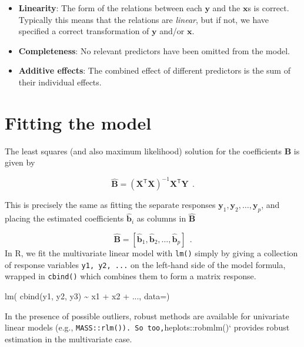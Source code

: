 \documentclass[
  letterpaper,
  10pt,
  krantz2]{krantz}
\makeatletter
\newenvironment{Shaded}{\begin{snugshade}}{\end{snugshade}}
\newcommand{\AttributeTok}[1]{\textcolor[rgb]{0.40,0.45,0.13}{#1}}
\newcommand{\FunctionTok}[1]{\textcolor[rgb]{0.28,0.35,0.67}{#1}}
\newcommand{\NormalTok}[1]{\textcolor[rgb]{0.00,0.23,0.31}{#1}}
\newcommand{\SpecialCharTok}[1]{\textcolor[rgb]{0.37,0.37,0.37}{#1}}
\newenvironment{kframe}{%
  \medskip{}
  \setlength{\fboxsep}{.8em}
  \def\at@end@of@kframe{}%
  \ifinner\ifhmode%
  \def\at@end@of@kframe{\end{minipage}}%
  \begin{minipage}{\columnwidth}%
  \fi\fi%
  \def\FrameCommand##1{\hskip\@totalleftmargin \hskip-\fboxsep
  \colorbox{shadecolor}{##1}\hskip-\fboxsep
      \hskip-\linewidth \hskip-\@totalleftmargin \hskip\columnwidth}%
  \MakeFramed {\advance\hsize-\width
    \@totalleftmargin\z@ \linewidth\hsize
    \@setminipage}}%
{\par\unskip\endMakeFramed%
  \at@end@of@kframe}
\renewenvironment{Shaded}{\begin{kframe}}{\end{kframe}}
\makeatother
\begin{document}
\begin{itemize}
\item
  \textbf{Linearity}: The form of the relations between each
  \(\mathbf{y}\) and the \(\mathbf{x}\)s is correct. Typically this
  means that the relations are \emph{linear}, but if not, we have
  specified a correct transformation of \(\mathbf{y}\) and/or
  \(\mathbf{x}\).
\item
  \textbf{Completeness}: No relevant predictors have been omitted from
  the model.
\item
  \textbf{Additive effects}: The combined effect of different predictors
  is the sum of their individual effects.
\end{itemize}

\section{Fitting the model}\label{fitting-the-model}

The least squares (and also maximum likelihood) solution for the
coefficients \(\mathbf{B}\) is given by

\[
\widehat{\mathbf{B}} = (\mathbf{X}^\mathsf{T} \mathbf{X})^{-1} \mathbf{X}^\mathsf{T} \mathbf{Y} \:\: .
\]

This is precisely the same as fitting the separate responses
\(\mathbf{y}_1 , \mathbf{y}_2 , \dots , \mathbf{y}_p\), and placing the
estimated coefficients \(\widehat{\mathbf{b}}_i\) as columns in
\(\widehat{\mathbf{B}}\)

\[
\widehat{\mathbf{B}} = [ \widehat{\mathbf{b}}_1, \widehat{\mathbf{b}}_2, \dots , \widehat{\mathbf{b}}_p] \:\: .
\] In R, we fit the multivariate linear model with \texttt{lm()} simply
by giving a collection of response variables \texttt{y1,\ y2,\ ...} on
the left-hand side of the model formula, wrapped in \texttt{cbind()}
which combines them to form a matrix response.

\begin{Shaded}
\begin{Highlighting}[]
\FunctionTok{lm}\NormalTok{( }\FunctionTok{cbind}\NormalTok{(y1, y2, y3) }\SpecialCharTok{\textasciitilde{}}\NormalTok{ x1 }\SpecialCharTok{+}\NormalTok{ x2 }\SpecialCharTok{+}\NormalTok{ ..., }\AttributeTok{data=}\NormalTok{)}
\end{Highlighting}
\end{Shaded}

In the presence of possible outliers, robust methods are available for
univariate linear models (e.g.,
\texttt{MASS::rlm()).\ So\ too,}heplots::robmlm()` provides robust
estimation in the multivariate case.
\end{document}
